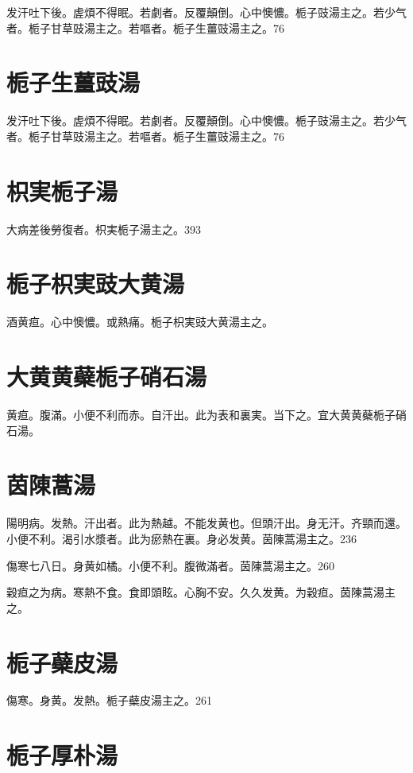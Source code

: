发汗吐下後。虗煩不得眠。若劇者。反覆顛倒。心中懊憹。栀子{\khaaitp 豉}湯主之。若少气者。栀子甘草{\khaaitp 豉}湯主之。若嘔者。栀子生薑{\khaaitp 豉}湯主之。76

\section{栀子生薑豉湯}

发汗吐下後。虗煩不得眠。若劇者。反覆顛倒。心中懊憹。栀子{\khaaitp 豉}湯主之。若少气者。栀子甘草{\khaaitp 豉}湯主之。若嘔者。栀子生薑{\khaaitp 豉}湯主之。76

\section{枳実栀子湯}

大病差後勞復者。枳実栀子湯主之。393

\section{栀子枳実豉大黄湯}

酒黄疸。心中懊憹。或熱痛。栀子{\khaaitp 枳実豉}大黄湯主之。

\section{大黄黄蘗栀子硝石湯}

黄疸。腹滿。小便不利而赤。自汗出。此为表和裏実。当下之。宜大黄{\khaaitp 黄蘗栀子}硝石湯。

\section{茵陳蒿湯}

陽明病。发熱。汗出者。此为熱越。不能发黄也。但頭汗出。身无汗。齐頸而還。小便不利。渴引水漿者。此为瘀熱在裏。身必发黄。茵陳{\khaaitp 蒿}湯主之。236

傷寒七八日。身黄如橘。小便不利。腹微滿者。茵陳{\khaaitp 蒿}湯主之。260

穀疸之为病。寒熱不食。食即頭眩。心胸不安。久久发黄。为穀疸。茵陳蒿湯主之。

\section{栀子蘗皮湯}

傷寒。身黄。发熱。栀子蘗皮湯主之。261

\section{栀子厚朴湯}

